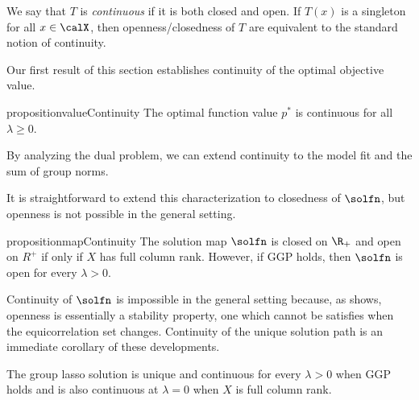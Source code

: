 We say that \( T \) is \emph{continuous} if it is both closed and open.
If \( T(x) \) is a singleton for all \( x \in \calX \),
then openness/closedness of \( T \) are equivalent to the standard
notion of continuity.

Our first result of this section establishes continuity of the optimal
objective value.

\begin{restatable}{proposition}{valueContinuity}\label{prop:value-continuity}
	The optimal function value \( p^* \) is continuous for all
	\( \lambda \geq 0 \).
\end{restatable}

By analyzing the dual problem, we can extend continuity to the
model fit and the sum of group norms.


It is straightforward to extend this characterization to closedness
of \( \solfn \), but openness is not possible in the general setting.

\begin{restatable}{proposition}{mapContinuity}\label{prop:map-continuity}
	The solution map \( \solfn \) is closed on \( \R_+ \)
	and open on \( R^+ \) if only if \( X \) has full column rank.
	However, if GGP holds, then \( \solfn \) is open for every \( \lambda > 0 \).
\end{restatable}

Continuity of \( \solfn \) is impossible in the general setting because, as \citet{hogan1973point} shows, openness is essentially a stability property, one which cannot be satisfies when the equicorrelation set changes.
Continuity of the unique solution path is an immediate corollary of
these developments.

\begin{corollary}
	The group lasso solution is unique and continuous for every \( \lambda > 0 \)
	when GGP holds and is also continuous at \( \lambda = 0 \) when \( X \)
	is full column rank.
\end{corollary}

